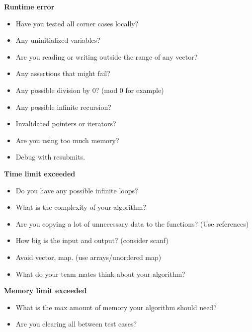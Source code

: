 \textbf{Runtime error}
\begin{itemize}[noitemsep]
\item Have you tested all corner cases locally?
\item Any uninitialized variables?
\item Are you reading or writing outside the range of any vector?
\item Any assertions that might fail?
\item Any possible division by 0? (mod 0 for example)
\item Any possible infinite recursion?
\item Invalidated pointers or iterators?
\item Are you using too much memory?
\item Debug with resubmits.
\end{itemize}

\textbf{Time limit exceeded}
\begin{itemize}[noitemsep]
\item Do you have any possible infinite loops?
\item What is the complexity of your algorithm?
\item Are you copying a lot of unnecessary data to the functions? (Use references)
\item How big is the input and output? (consider scanf)
\item Avoid vector, map. (use arrays/unordered map)
\item What do your team mates think about your algorithm?
\end{itemize}

\textbf{Memory limit exceeded}
\begin{itemize}[noitemsep]
\item What is the max amount of memory your algorithm should need?
\item Are you clearing all between test cases?
\end{itemize}
